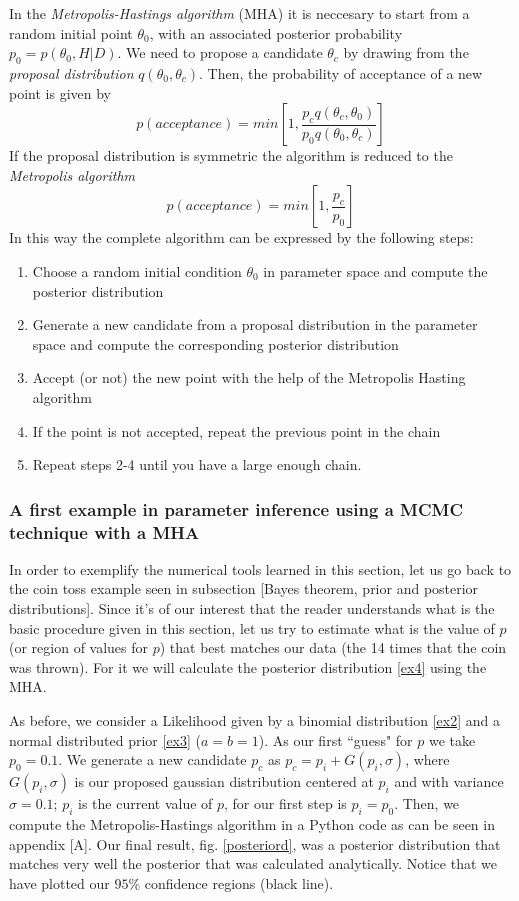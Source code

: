 \documentclass[onecolumn,           %
               showpacs,            %
               preprintnumbers,     %
               aps,                 %
               prl,          	    %
               letterpaper,             %
               superscriptaddress,      %
               nofootinbib,         %
               tightenlines,        %
               floats,floatfix      %
               ,usenatbib,
               ]{revtex4-1}
\begin{document}
In the \textit{Metropolis-Hastings algorithm} (MHA) \cite{metr} it is neccesary to start from a random initial point $\theta_0$, with an associated posterior probability $p_0=p(\theta_0,H|D)$. We need to propose a candidate $\theta_c$ by drawing from the \textit{proposal distribution} $q(\theta_0,\theta_c)$. Then, the probability of acceptance of a new point is given by
\begin{equation}
p(acceptance)=min\left[1,\frac{p_cq(\theta_c,\theta_0)}{p_0q(\theta_0,\theta_c)}\right]
\end{equation}
If the proposal distribution is symmetric the algorithm is reduced to the \textit{Metropolis algorithm}
  \begin{equation}
  p(acceptance)=min\left[1,\frac{p_c}{p_0}\right]
  \end{equation}
In this way the complete algorithm can be expressed by the following steps:
\begin{enumerate}
\item Choose a random initial condition $\theta_0$ in parameter space and compute the posterior distribution
\item Generate a new candidate from a proposal distribution in the parameter space and compute the corresponding posterior distribution
\item Accept (or not) the new point with the help of the Metropolis Hasting algorithm
\item If the point is not accepted, repeat the previous point in the chain
\item Repeat steps 2-4 until you have a large enough chain.
\end{enumerate}

\subsubsection{A first example in parameter inference using a MCMC technique with a MHA}

In order to exemplify the numerical tools learned in this section, let us 
go back to the coin toss example seen in subsection [Bayes theorem, prior and posterior distributions]. Since it's of our interest that the reader understands what is the basic procedure given in this section, let us try to estimate what is the value of $p$ (or region of values for $p$) that best matches our data (the 14 times that the coin was thrown). For it we will calculate the posterior distribution \eqref{ex4} using the MHA. 

As before, we consider a Likelihood given by a binomial distribution \eqref{ex2} and a normal distributed prior \eqref{ex3} ($a=b=1$). As our first ``guess" for $p$ we take $p_0=0.1$. We generate a new candidate $p_c$ as $p_c=p_i+G(p_i,\sigma)$, where $G(p_i,\sigma)$ is our proposed gaussian distribution centered at $p_i$ and with variance $\sigma=0.1$; $p_i$ is the current value of $p$, for our first step is $p_i=p_0$. Then, we compute the Metropolis-Hastings algorithm in a Python code as can be seen in appendix [A]. Our final result,  fig. \ref{posteriord}, was a posterior distribution that matches very well the posterior that was calculated analytically. Notice that we have plotted our $95\%$ confidence regions (black line). 
\end{document}
